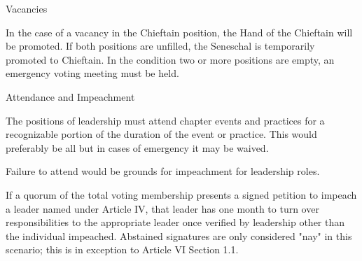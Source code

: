 \documentclass[12pt]{article}
\begin{document}
\begin{level}
    \item Vacancies
    \begin{level} 
        \item In the case of a vacancy in the Chieftain position, the Hand of the Chieftain will be
    promoted. If both positions are unfilled, the Seneschal is temporarily promoted to Chieftain. In the condition two or more positions are empty, an emergency voting meeting must be held.
    \end{level}

    \item Attendance and Impeachment
    \begin{level} 
        \item The positions of leadership must attend chapter events and practices for a recognizable portion of the duration of the event or practice. This would preferably be all but in cases of emergency it may be waived.
        \item Failure to attend would be grounds for impeachment for leadership roles.
        \item If a quorum of the total voting membership presents a signed petition to impeach a leader named under Article IV, that leader has one month to turn over responsibilities to the appropriate leader once verified by leadership other than the individual impeached. Abstained signatures are only considered "nay" in this scenario; this is in exception to Article VI Section 1.1.
    \end{level}


\end{level}
\end{document}
